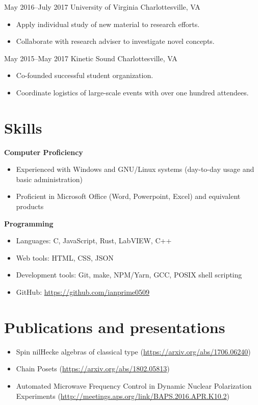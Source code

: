 \documentclass[10pt]{article}
\begin{document}
{May 2016--July 2017}
{University of Virginia}
{Charlottesville, VA}
\begin{itemize}
\item Apply individual study of new material to research efforts.
\item Collaborate with research adviser to investigate novel concepts.
\end{itemize}

{May 2015--May 2017}
{Kinetic Sound}
{Charlottesville, VA}
\begin{itemize}
\item Co-founded successful student organization.
\item Coordinate logistics of large-scale events with over one hundred
  attendees.
\end{itemize}

\section*{Skills}
\textbf{Computer Proficiency}
\begin{itemize}
\item Experienced with Windows and GNU/Linux systems (day-to-day usage
  and basic administration)
\item Proficient in Microsoft Office (Word, Powerpoint, Excel) and
  equivalent products
\end{itemize}

\textbf{Programming}
\begin{itemize}
\item Languages: C, JavaScript, Rust, LabVIEW, C++
\item Web tools: HTML, CSS, JSON
\item Development tools: Git, make, NPM/Yarn, GCC, POSIX shell
  scripting
\item GitHub: \url{https://github.com/ianprime0509}
\end{itemize}

\section*{Publications and presentations}
\begin{itemize}
\item Spin nilHecke algebras of classical type
  (\url{https://arxiv.org/abs/1706.06240})
\item Chain Posets (\url{https://arxiv.org/abs/1802.05813})
\item Automated Microwave Frequency Control in Dynamic Nuclear
  Polarization Experiments
  (\url{http://meetings.aps.org/link/BAPS.2016.APR.K10.2})
\end{itemize}
\end{document}
